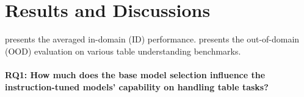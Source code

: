 \documentclass[11pt]{article}
\newcommand{\grayc}[0]{\cellcolor[rgb]{0.957,0.957,0.957}}
\begin{document}


\section{Results and Discussions}




 presents the averaged in-domain (ID) performance.
 presents the out-of-domain (OOD) evaluation on various table understanding benchmarks.


\paragraph{RQ1: How much does the base model selection influence the instruction-tuned models' capability on handling table tasks?}
\end{document}
